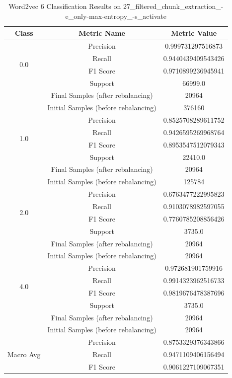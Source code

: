 \begin{longtable}{|c|c|c|}
\caption{Word2vec 6 Classification Results on 27\_filtered\_chunk\_extraction\_-e\_only-max-entropy\_-s\_activate} \label{tab:27_filtered_chunk_extraction_-e_only-max-entropy_-s_activate_word2vec_6_classifiers_results} \\
\hline
Class & Metric Name & Metric Value \\
\hline
\multirow{4}{*}{0.0} & Precision & 0.999731297516873 \\
 & Recall & 0.9440439409543426 \\
 & F1 Score & 0.9710899236945941 \\
 & Support & 66999.0 \\
 & Final Samples (after rebalancing) & 20964 \\
 & Initial Samples (before rebalancing) & 376160 \\
\hline
\multirow{4}{*}{1.0} & Precision & 0.8525708289611752 \\
 & Recall & 0.9426595269968764 \\
 & F1 Score & 0.8953547512079343 \\
 & Support & 22410.0 \\
 & Final Samples (after rebalancing) & 20964 \\
 & Initial Samples (before rebalancing) & 125784 \\
\hline
\multirow{4}{*}{2.0} & Precision & 0.6763477222995823 \\
 & Recall & 0.9103078982597055 \\
 & F1 Score & 0.7760785208856426 \\
 & Support & 3735.0 \\
 & Final Samples (after rebalancing) & 20964 \\
 & Initial Samples (before rebalancing) & 20964 \\
\hline
\multirow{4}{*}{4.0} & Precision & 0.972681901759916 \\
 & Recall & 0.9914323962516733 \\
 & F1 Score & 0.9819676478387696 \\
 & Support & 3735.0 \\
 & Final Samples (after rebalancing) & 20964 \\
 & Initial Samples (before rebalancing) & 20964 \\
\hline
\multirow{4}{*}{Macro Avg} & Precision & 0.8753329376343866 \\
 & Recall & 0.9471109406156494 \\
 & F1 Score & 0.9061227109067351 \\

\end{longtable}
